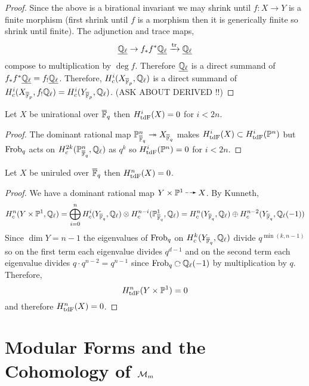 \documentclass[12pt]{article}
\begin{document}
\begin{proof}
Since the above is a birational invariant we may shrink until $f : X \to Y$ is a finite morphism (first shrink until $f$ is a morphism then it is generically finite so shrink until finite). The adjunction and trace maps,
\[ \underline{\mathbb{Q}_\ell} \to f_* f^* \underline{\mathbb{Q}_\ell} \xrightarrow{\mathrm{tr}} \underline{\mathbb{Q}_\ell} \]
compose to multiplication by $\deg{f}$. Therefore $\underline{\mathbb{Q}_\ell}$ is a direct summand of $f_* f^* \underline{\mathbb{Q}_\ell} = f_! \underline{\mathbb{Q}_\ell}$. Therefore, $H^i_c(X_{\overline{\mathbb{F}}_p}, \mathbb{Q}_\ell)$ is a direct summand of $H^i_c(X_{\overline{\mathbb{F}}_p}, f_! \mathbb{Q}_\ell) = H^i_c(Y_{\overline{\mathbb{F}}_p}, \mathbb{Q}_\ell)$.
(ASK ABOUT DERIVED !!)
\end{proof}

\begin{cor}
Let $X$ be unirational over $\overline{\mathbb{F}}_q$ then $H^i_{\mathrm{tdF}}(X) = 0$ for $i < 2n$.
\end{cor}

\begin{proof}
The dominant rational map $\mathbb{P}^n_{\overline{\mathbb{F}}_q} \twoheadrightarrow X_{\overline{\mathbb{F}}_q}$ makes $H^i_{\mathrm{tdF}}(X) \subset H^i_{\mathrm{tdF}}(\mathbb{P}^n)$ but $\mathrm{Frob}_q$ acts on $H^{2k}_c(\mathbb{P}^n_{\overline{\mathbb{F}}_q}, \mathbb{Q}_\ell)$ as $q^k$ so $H^i_{\mathrm{tdF}}(\mathbb{P}^n) = 0$ for $i < 2n$.  
\end{proof}

\begin{cor}
Let $X$ be uniruled over $\overline{\mathbb{F}}_q$ then $H^n_{\mathrm{tdF}}(X) = 0$. 
\end{cor}

\begin{proof}
We have a dominant rational map $Y \times \P^1 \rat X$. By Kunneth,
\[ H_c^n(Y \times \mathbb{P}^1, \mathbb{Q}_\ell) = \bigoplus_{i = 0}^n H_c^i(Y_{\overline{\mathbb{F}}_q}, \mathbb{Q}_\ell) \otimes H_c^{n-i}(\mathbb{P}^1_{\overline{\mathbb{F}}_q}, \mathbb{Q}_\ell) = H^n_c(Y_{\overline{\mathbb{F}}_q}, \mathbb{Q}_\ell) \oplus H^{n-2}_{c}(Y_{\overline{\mathbb{F}}_q}, \mathbb{Q}_\ell(-1)) \]
Since $\dim{Y} = n-1$ the eigenvalues of $\mathrm{Frob}_q$ on $H^k_c(Y_{\overline{\mathbb{F}}_q}, \mathbb{Q}_\ell)$ divide $q^{\min{\left(k, n-1\right)}}$ so on the first term each eigenvalue divides $q^{d-1}$ and on the second term each eigenvalue divides $q \cdot q^{n-2} = q^{n-1}$ since $\Frob_q \acts \Q_\ell(-1)$ by multiplication by $q$. Therefore,
\[ H^n_{\mathrm{tdF}}(Y \times \mathbb{P}^1) = 0 \]
and therefore $H^n_{\mathrm{tdF}}(X) = 0$. 
\end{proof}

\section{Modular Forms and the Cohomology of $\mathcal{M}_m$}
\end{document}
